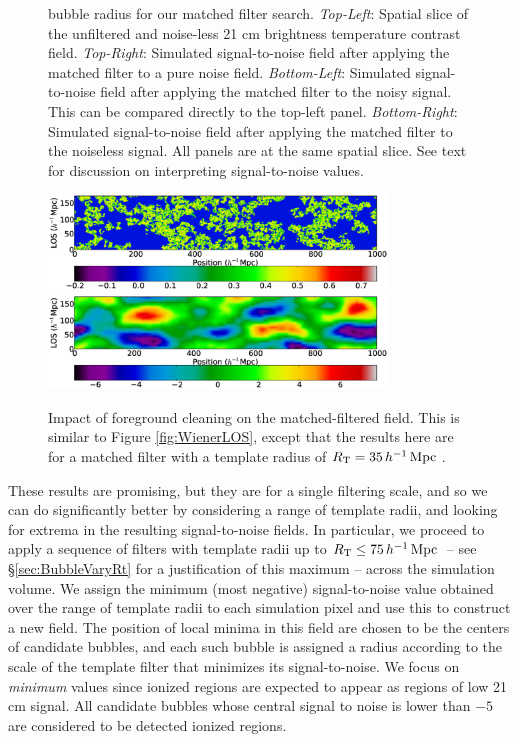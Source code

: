 \begin{figure}[h]
{    bubble radius for our matched filter search. \textit{Top-Left}: Spatial slice of the
    unfiltered and noise-less 21 cm brightness temperature contrast
    field. \textit{Top-Right}: Simulated signal-to-noise field after
    applying the matched filter to a pure noise
    field. \textit{Bottom-Left}: Simulated signal-to-noise field
    after applying the matched filter to the noisy
    signal. This can be compared directly to the top-left panel. \textit{Bottom-Right}: Simulated signal-to-noise field after applying the matched filter to the noiseless signal. All panels are at the same spatial slice. See text for discussion on interpreting signal-to-noise values.}
  \label{fig:ThreeFigureMatched}
\end{figure}


\begin{figure}[h]
  \centering
  \includegraphics[width=9cm]{f6a.eps}
  \includegraphics[width=9cm]{f6b.eps}
  \caption{Impact of foreground cleaning on the matched-filtered field. This is similar to Figure \ref{fig:WienerLOS}, except
that the results here are for a matched filter with a template 
radius of $R_{\text{T}} = 35 \,h^{-1}\,{\rm Mpc}\,$.}
  \label{fig:MatchedLOS}
\end{figure}

These results are promising, but they are for a single filtering scale, and
so we can 
do significantly better by considering a range of template radii, and looking
for extrema in the resulting signal-to-noise fields. In particular,
we proceed to apply a sequence of filters with template radii up to
$R_{\text{T}} \leq 75\,h^{-1}\,{\rm Mpc}\,$ -- see \S \ref{sec:BubbleVaryRt} for a justification of
this maximum -- across the simulation volume. 
We assign the minimum (most negative)
signal-to-noise value obtained over the range of template
radii to each simulation pixel and use this to construct a new field. The position of local minima
in this field are chosen to be the centers of candidate bubbles, and each such bubble is
assigned a radius according to the scale of the template filter that minimizes its
signal-to-noise. We focus on \textit{minimum} values since ionized regions are expected
to appear as regions of low 21 cm signal. All candidate bubbles whose central signal to noise
is lower than $-5$ are considered to be detected ionized regions.

